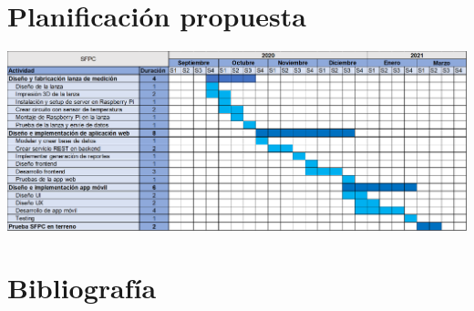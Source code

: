 \documentclass[12pt, letterpaper]{article}
\begin{document}
\section{Planificación propuesta }
\includegraphics[scale=0.45]{figures/gantt.png}


\section{Bibliografía}
\end{document}
